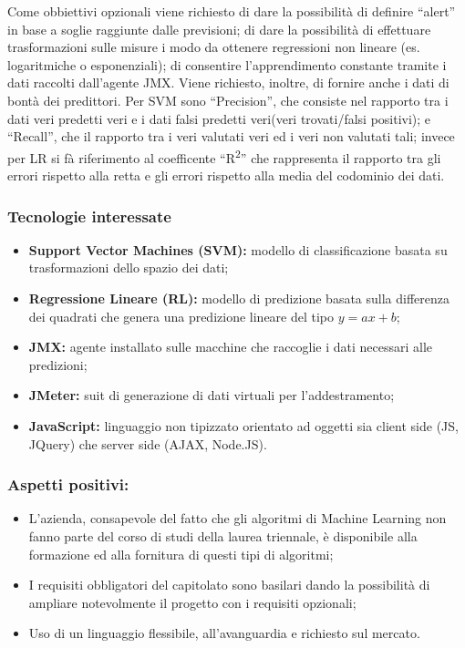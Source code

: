 			Come obbiettivi opzionali viene richiesto di dare la possibilità di definire ``alert'' in base a soglie raggiunte dalle previsioni; di dare la possibilità di effettuare trasformazioni sulle misure i modo da ottenere regressioni non lineare (es. logaritmiche o esponenziali); di consentire l'apprendimento constante tramite i dati raccolti dall'agente JMX. Viene richiesto, inoltre,  di fornire anche i dati di bontà dei predittori. Per SVM sono ``Precision'', che consiste nel rapporto tra i dati veri predetti veri e i dati falsi predetti veri(veri trovati/falsi positivi); e ``Recall'', che il rapporto tra i veri valutati veri ed i veri non valutati tali; invece per LR si fà riferimento al coefficente ``R\textsuperscript{2}'' che rappresenta il rapporto tra gli errori rispetto alla retta e gli errori rispetto alla media del codominio dei dati.


		\subsubsection{Tecnologie interessate}
			\begin{itemize}
			  \item \textbf{Support Vector Machines (SVM):} modello di classificazione basata su trasformazioni dello spazio dei dati;
			  \item \textbf{Regressione Lineare (RL):} modello di predizione basata sulla differenza dei quadrati che genera una predizione lineare del tipo \(y=ax+b\);
				\item \textbf{JMX:} agente installato sulle macchine che raccoglie i dati necessari alle predizioni;
				\item \textbf{JMeter:} suit di generazione di dati virtuali per l'addestramento;
			  \item \textbf{JavaScript:} linguaggio non tipizzato orientato ad oggetti sia client side (JS, JQuery) che server side (AJAX, Node.JS).
			\end{itemize}

		\subsubsection{Aspetti positivi:}
			\begin{itemize}
			  \item L’azienda, consapevole del fatto che gli algoritmi di Machine Learning non fanno parte del corso di studi della laurea triennale, è disponibile alla formazione ed alla fornitura di questi tipi di algoritmi;
			  \item I requisiti obbligatori del capitolato sono basilari dando la possibilità di ampliare notevolmente il progetto con i requisiti opzionali;
			  \item Uso di un linguaggio flessibile, all'avanguardia e richiesto sul mercato.
			\end{itemize}

